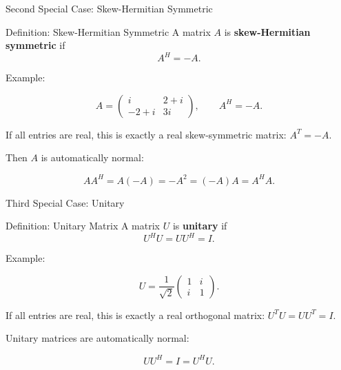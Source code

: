\documentclass[10pt]{beamer}
\theoremstyle{definition}
\newcommand{\x}[1]{\alert{\textbf{#1}}}
\begin{document}
\begin{frame}[shrink=5]{Second Special Case: Skew-Hermitian Symmetric}

\begin{block}{Definition: Skew-Hermitian Symmetric}
A matrix $A$ is \x{skew-Hermitian symmetric} if
$$
A^H=-A.
$$
\end{block}

\vfill

Example:

$$
A=\begin{pmatrix}
i&2+i\\
-2+i&3i
\end{pmatrix},
\qquad
A^H=-A.
$$

If all entries are real, this is exactly a real skew-symmetric matrix: $A^T=-A$.

\vfill\pause

Then $A$ is automatically normal:

$$
AA^H=A(-A)=-A^2=(-A)A=A^HA.
$$

\end{frame}


\begin{frame}{Third Special Case: Unitary}

\begin{block}{Definition: Unitary Matrix}
A matrix $U$ is \x{unitary} if
$$
U^HU=UU^H=I.
$$
\end{block}

\vfill

Example:

$$
U=\frac{1}{\sqrt{2}}
\begin{pmatrix}
1&i\\
i&1
\end{pmatrix}.
$$

If all entries are real, this is exactly a real orthogonal matrix: $U^TU=UU^T=I$.

\vfill\pause

Unitary matrices are automatically normal:

$$
UU^H=I=U^HU.
$$

\end{frame}
\end{document}
